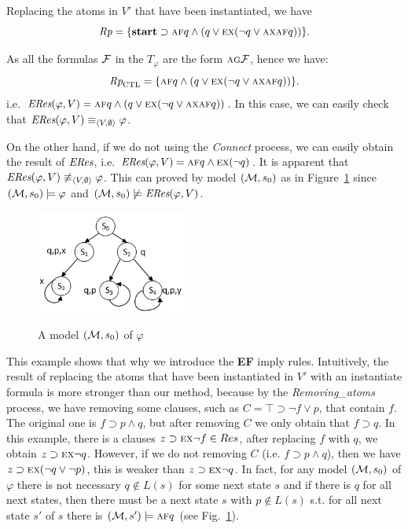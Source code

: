 \documentclass[letterpaper]{article} %
\begin{document}
\begin{example}
Replacing the atoms in $V'$ that have been instantiated, we have
\[
\emph{Rp}= \{\textbf{start} \supset  \textsc{a}\textsc{f} q \wedge (q \vee \textsc{e} \textsc{x}(\neg q \vee \textsc{a}\textsc{x} \textsc{a}\textsc{f} q))\}.
\]

As all the formulas $\cal F$ in the $T_{\varphi}$ are the form $\textsc{a}\textsc{g} \cal F$, hence we have:
\[
\emph{Rp}_{\textrm{CTL}} = \{\textsc{a}\textsc{f} q \wedge (q \vee \textsc{e} \textsc{x}(\neg q \vee \textsc{a}\textsc{x} \textsc{a}\textsc{f} q))\}.
\]
i.e. $\emph{ERes}(\varphi, V) = \textsc{a}\textsc{f} q \wedge (q \vee \textsc{e} \textsc{x}(\neg q \vee \textsc{a}\textsc{x} \textsc{a}\textsc{f} q))$.
In this case, we can easily check that $\emph{ERes}(\varphi, V) \equiv_{{\langle{V, \emptyset}\rangle}} \varphi$.


On the other hand, if we do not using the \emph{Connect} process, we can easily obtain the result of $\emph{ERes}$, i.e. $\emph{ERes}(\varphi, V) = \textsc{a}\textsc{f} q \wedge  \textsc{e} \textsc{x}(\neg q)$.
It is apparent that $\emph{ERes}(\varphi, V) \not\equiv_{{\langle{V, \emptyset}\rangle}} \varphi$. This can proved by model $({\cal M},s_0)$ as in Figure~\ref{Fig:models} since $({\cal M}, s_0) \models \varphi$ and $({\cal M}, s_0) \not \models \emph{ERes}(\varphi, V)$.
\begin{figure}
  \centering
  \includegraphics[width=5cm]{models.png}\\
  \caption{A model $({\cal M}, s_0)$ of $\varphi$}\label{Fig:models}
\end{figure}
\end{example}

This example shows that why we introduce the \textbf{EF} imply rules. Intuitively, the result of replacing the atoms that have been instantiated in $V'$ with an instantiate formula is more stronger than our method, because by the \emph{Removing\_atoms} process, we have removing some clauses, such as $C= \top \supset \neg f \vee p$, that contain $f$. The original one is $f \supset p \wedge q$, but after removing $C$ we only obtain that $f \supset q$. In this example, there is a clauses $z \supset \textsc{e} \textsc{x} \neg f \in Res$, after replacing $f$ with $q$, we obtain $z \supset \textsc{e} \textsc{x} \neg q$. However, if we do not removing $C$ (i.e. $f \supset p \wedge q$), then we have $z \supset \textsc{e} \textsc{x} (\neg q \vee \neg p)$, this is weaker than $z \supset \textsc{e} \textsc{x} \neg q$.
In fact, for any model $({\cal M}, s_0)$ of $\varphi$ there is not necessary $q\not \in L(s)$ for some next state $s$ and if there is $q$ for all next states, then there must be a next state $s$ with $p \not \in L(s)$ s.t. for all next state $s'$ of $s$ there is $({\cal M}, s')\models \textsc{a}\textsc{f} q$ (see Fig.~\ref{Fig:models}).
\end{document}

